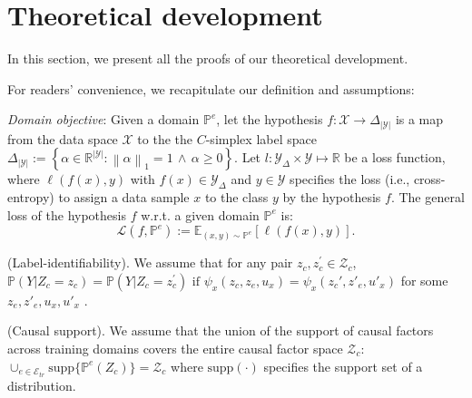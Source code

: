 \section{Theoretical development}
\label{apd:proof}
In this section, we present all the proofs  of our theoretical development. 

For readers' convenience, we recapitulate our definition and assumptions:

\textit{Domain objective}: Given a domain $\mathbb{P}^e$, let the hypothesis $f:\mathcal{X}\rightarrow\Delta_{\left | \mathcal{Y} \right |}$ is a map from the data space $\mathcal{X}$ to the the $C$-simplex label space $\Delta_{\left | \mathcal{Y} \right |}:=\left\{ \alpha\in\mathbb{R}^{\left | \mathcal{Y} \right |}:\left \| \alpha \right \|_{1}=1\,\land\,\alpha\geq 0\right\}$.
Let $l:\mathcal{Y}_{\Delta}\times\mathcal{Y}\mapsto\mathbb{R}$ be a loss function, where $\ell\left(f\left(x\right),y\right)$ with
$f\left(x\right)\in\mathcal{Y}_{\Delta}$ and $y\in\mathcal{Y}$
specifies the loss (i.e., cross-entropy) to
assign a data sample $x$ to the class $y$ by the hypothesis $f$. The general 
loss of the hypothesis $f$ w.r.t. a given domain $\mathbb{P}^e$ is:
\begin{equation}
\mathcal{L}\left(f,\mathbb{P}^e\right):=\mathbb{E}_{\left(x,y\right)\sim\mathbb{P}^e}\left[\ell\left(f\left(x\right),y\right)\right].   
\end{equation}



\begin{assumption} (Label-identifiability). We assume that for any pair $z_c, z^{'}_c\in \mathcal{Z}_c$,  $\mathbb{P}(Y|Z_c=z_c) = \mathbb{P}(Y|Z_c=z^{'}_c) \text{ if } \psi_x(z_c,z_e,u_x)=\psi_x(z_c',z'_e,u'_x)$ for some $z_e, z'_e, u_x, u'_x$
\label{as:label_idf_apd}.
\end{assumption}


\begin{assumption} (Causal support). We assume that the union of the support of causal factors across training domains covers the entire causal factor space $\mathcal{Z}_c$: $\cup_{e\in \mathcal{E}_{tr}}\text{supp}\{\mathbb{P}^{e} \left (Z_c \right )\}=\mathcal{Z}_c$ where $\text{supp}(\cdot)$ specifies the support set of a distribution. 
\label{as:sufficient_causal_support_apd}
\end{assumption}


